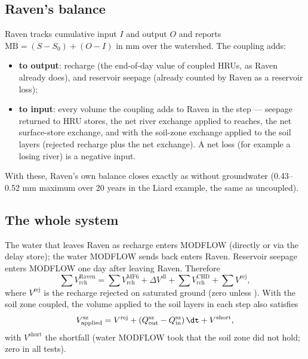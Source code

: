 \subsection{Raven's balance}
Raven tracks cumulative input $I$ and output $O$ and reports $\mathrm{MB}=\left(S-S_0\right)+\left(O-I\right)$ in mm over
the watershed. The coupling adds:
\begin{itemize}
\item \textbf{to output}: recharge (the end-of-day  value of coupled HRUs, as Raven already does), and
reservoir seepage (already counted by Raven as a reservoir loss);
\item \textbf{to input}: every volume the coupling adds to Raven in the step --- seepage returned to HRU stores, the net
river exchange applied to reaches, the net surface-store exchange, and with  the soil-zone
exchange applied to the soil layers (rejected recharge plus the net exchange). A net loss (for example a losing river)
is a negative input.
\end{itemize}
With these, Raven's own balance closes exactly as without groundwater (0.43--0.52 mm maximum over 20 years in the Liard
example, the same as uncoupled).

\subsection{The whole system}
The water that leaves Raven as recharge enters MODFLOW (directly or via the delay store); the water MODFLOW sends back
enters Raven. Reservoir seepage enters MODFLOW one day after leaving Raven. Therefore
\begin{equation}
\sum V^{\mathrm{Raven}}_{\mathrm{rch}}=\sum V^{\mathrm{MF6}}_{\mathrm{rch}}+\Delta V^{\mathrm{dl}}+\sum V^{\mathrm{CHD}}_{\mathrm{rch}}+\sum V^{\mathrm{rej}},
\end{equation}
where $V^{\mathrm{rej}}$ is the recharge rejected on saturated ground (zero unless ). With the soil
zone coupled, the volume applied to the soil layers in each step also satisfies
\begin{equation}
V^{\mathrm{sz}}_{\mathrm{applied}}=V^{\mathrm{rej}}+\left(Q^{\mathrm{sz}}_{\mathrm{out}}-Q^{\mathrm{sz}}_{\mathrm{in}}\right)\dt+V^{\mathrm{short}},
\end{equation}
with $V^{\mathrm{short}}$ the shortfall (water MODFLOW took that the soil zone did not hold; zero in all tests).

